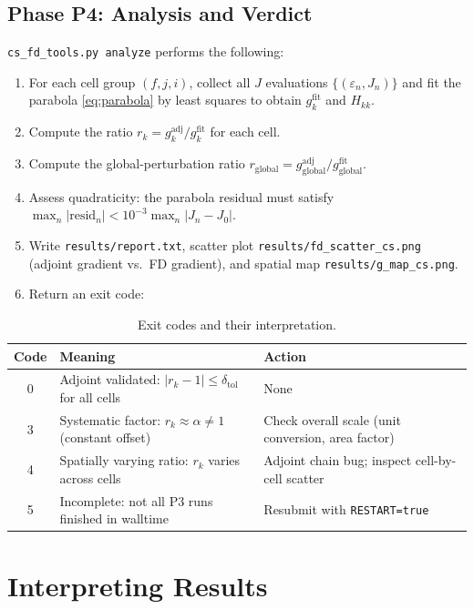 \documentclass[12pt]{article}
\newcommand{\gadj}{g^{\mathrm{adj}}}
\newcommand{\gfit}{g^{\mathrm{fit}}}
\newcommand{\eps}{\varepsilon}
\begin{document}
\subsection{Phase P4: Analysis and Verdict}

\texttt{cs\_fd\_tools.py analyze} performs the following:

\begin{enumerate}
  \item For each cell group $(f,j,i)$, collect all $J$ evaluations
        $\{(\eps_n, J_n)\}$ and fit the parabola \eqref{eq:parabola} by
        least squares to obtain $\gfit_k$ and $H_{kk}$.
  \item Compute the ratio $r_k = \gadj_k / \gfit_k$ for each cell.
  \item Compute the global-perturbation ratio
        $r_{\mathrm{global}} = \gadj_{\mathrm{global}} / \gfit_{\mathrm{global}}$.
  \item Assess quadraticity: the parabola residual must satisfy
        $\max_n|\mathrm{resid}_n| < 10^{-3} \max_n|J_n - J_0|$.
  \item Write \texttt{results/report.txt}, scatter plot
        \texttt{results/fd\_scatter\_cs.png} (adjoint gradient vs.\ FD
        gradient), and spatial map \texttt{results/g\_map\_cs.png}.
  \item Return an exit code:
\end{enumerate}

\begin{table}[h!]
\centering
\caption{Exit codes and their interpretation.}
\begin{tabular}{cll}
\toprule
Code & Meaning & Action \\
\midrule
0 & Adjoint validated: $|r_k - 1| \leq \delta_{\mathrm{tol}}$ for all cells
  & None \\
3 & Systematic factor: $r_k \approx \alpha \neq 1$ (constant offset)
  & Check overall scale (unit conversion, area factor) \\
4 & Spatially varying ratio: $r_k$ varies across cells
  & Adjoint chain bug; inspect cell-by-cell scatter \\
5 & Incomplete: not all P3 runs finished in walltime
  & Resubmit with \texttt{RESTART=true} \\
\bottomrule
\end{tabular}
\end{table}

\section{Interpreting Results}
\end{document}
